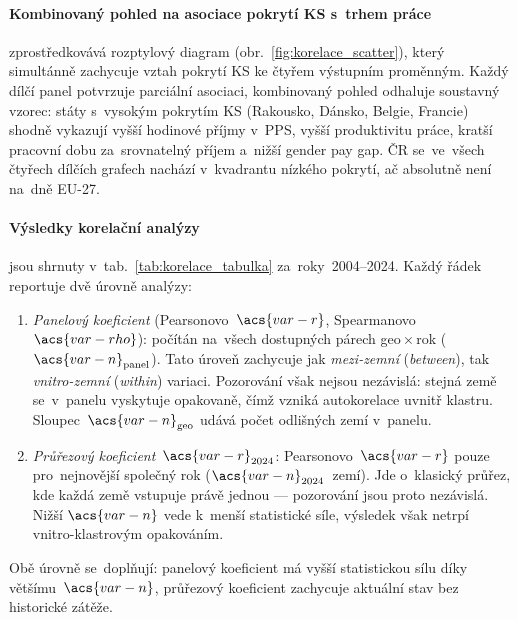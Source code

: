 \paragraph{Kombinovaný pohled na asociace pokrytí \acs{KS} s~trhem práce}\label{par:scatter_combined} zprostředkovává rozptylový diagram (obr.~\ref{fig:korelace_scatter}), který simultánně zachycuje
vztah pokrytí \acs{KS} ke čtyřem výstupním proměnným.
Každý dílčí panel potvrzuje parciální asociaci, kombinovaný pohled odhaluje
soustavný vzorec: státy s~vysokým pokrytím \acs{KS} (Rakousko, Dánsko, Belgie, Francie)
shodně vykazují vyšší hodinové příjmy v~\acs{PPS}, vyšší produktivitu
práce, kratší pracovní dobu za~srovnatelný příjem a~nižší gender pay gap.
\Ac{ČR} se~ve~všech čtyřech dílčích grafech nachází v~kvadrantu nízkého
pokrytí, ač absolutně není na~dně EU-27.



\paragraph{Výsledky korelační analýzy}\label{par:korelace_vysledky} jsou shrnuty v~tab.~\ref{tab:korelace_tabulka} za~roky~2004--2024.
Každý řádek reportuje dvě úrovně analýzy:
\begin{enumerate}
  \item \emph{Panelový koeficient} (Pearsonovo~$\acs{var-r}$,
    Spearmanovo~$\acs{var-rho}$): počítán na~všech dostupných párech
    geo\,$\times$\,rok ($\acs{var-n}_{\text{panel}}$). Tato úroveň zachycuje jak
    \emph{mezi-zemní} (\textit{between}), tak \emph{vnitro-zemní} (\textit{within})
    variaci. Pozorování však nejsou nezávislá: stejná země se~v~panelu
    vyskytuje opakovaně, čímž vzniká autokorelace uvnitř klastru.
    Sloupec~$\acs{var-n}_{\text{geo}}$ udává počet odlišných zemí v~panelu.
  \item \emph{Průřezový koeficient}~$\acs{var-r}_{2024}$: Pearsonovo~$\acs{var-r}$
    pouze pro~nejnovější společný rok ($\acs{var-n}_{2024}$~zemí). Jde o~klasický
    průřez, kde každá země vstupuje právě jednou --- pozorování jsou proto
    nezávislá. Nižší $\acs{var-n}$ vede k~menší statistické síle, výsledek však
    netrpí vnitro-klastrovým opakováním.
\end{enumerate}
Obě úrovně se~doplňují: panelový koeficient má vyšší statistickou sílu díky
většímu~$\acs{var-n}$, průřezový koeficient zachycuje aktuální stav bez
historické zátěže.



